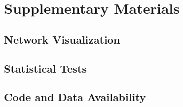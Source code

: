 \documentclass[11pt]{article}
\begin{document}
\section*{Supplementary Materials}
\subsection*{Network Visualization}

\subsection*{Statistical Tests}


\subsection*{Code and Data Availability}


% 
\end{document}
